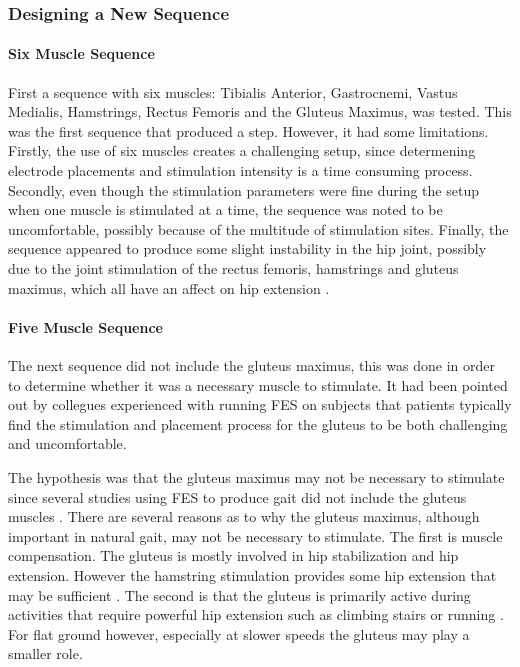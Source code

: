 \subsubsection{Designing a New Sequence}

\paragraph*{Six Muscle Sequence}
First a sequence with six muscles: Tibialis Anterior, Gastrocnemi, Vastus Medialis, Hamstrings, Rectus Femoris and the Gluteus Maximus, was tested. This was the first sequence that produced a step. However, it had some limitations. Firstly, the use of six muscles creates a challenging setup, since determening electrode placements and stimulation intensity is a time consuming process. Secondly, even though the stimulation parameters were fine during the setup when one muscle is stimulated at a time, the sequence was noted to be uncomfortable, possibly because of the multitude of stimulation sites. Finally, the sequence appeared to produce some slight instability in the hip joint, possibly due to the joint stimulation of the rectus femoris, hamstrings and gluteus maximus, which all have an affect on hip extension .

\paragraph*{Five Muscle Sequence}
The next sequence did not include the gluteus maximus, this was done in order to determine whether it was a necessary muscle to stimulate. It had been pointed out by collegues experienced with running FES on subjects that patients typically find the stimulation and placement process for the gluteus to be both challenging and uncomfortable. 

The hypothesis was that the gluteus maximus may not be necessary to stimulate since several studies using FES to produce gait did not include the gluteus muscles \cite{aout_effects_2023}. There are several reasons as to why the gluteus maximus, although important in natural gait, may not be necessary to stimulate. The first is muscle compensation. The gluteus is mostly involved in hip stabilization and hip extension. However the hamstring stimulation provides some hip extension that may be sufficient \cite{kang_activation_2013}. The second is that the gluteus is primarily active during activities that require powerful hip extension such as climbing stairs or running \cite{noauthor_gluteus_nodate}. For flat ground however, especially at slower speeds the gluteus may play a smaller role.

